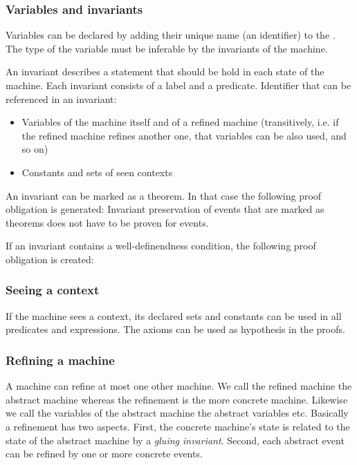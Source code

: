 \subsubsection{Variables and invariants}
Variables can be declared by adding their unique name (an identifier) to the .
The type of the variable must be inferable by the invariants of the machine.

An invariant describes a statement that should be hold in each state of the machine.
Each invariant consists of a label and a predicate.
Identifier that can be referenced in an invariant:
\begin{itemize}
\item Variables of the machine itself and of a refined machine (transitively, i.e. if the refined machine refines another one, that variables can be also used, and so on)
\item Constants and sets of seen contexts
\end{itemize}

An invariant can be marked as a theorem. In that case the following proof obligation is generated:
Invariant preservation of events that are marked as theorems does not have to be proven for events.

If an invariant contains a well-definendness condition, the following proof obligation is created:

\subsubsection{Seeing a context}
If the machine sees a context, its declared sets and constants can be used in
 all predicates and expressions.
The axioms can be used as hypothesis in the proofs.

\subsubsection{Refining a machine}
A machine can refine at most one other machine. 
We call the refined machine the abstract machine whereas the refinement is the more concrete machine.
Likewise we call the variables of the abstract machine the abstract variables etc.
Basically a refinement has two aspects. First, the concrete machine's state is related to the state of the
abstract machine by a \emph{gluing invariant}. Second, each abstract event can be refined by one or more
concrete events.

